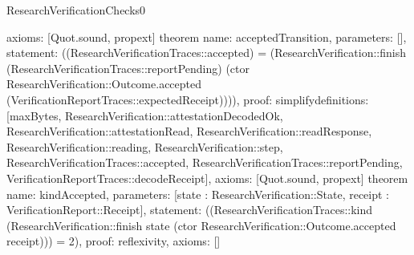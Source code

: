 \begin{lexlean}{ResearchVerificationChecks0}
\begin{semanticmodule}
{  axioms: [Quot.sound, propext]
}
theorem{
  name: acceptedTransition,
  parameters: [],
  statement: ((ResearchVerificationTraces::accepted) = (ResearchVerification::finish (ResearchVerificationTraces::reportPending) (ctor ResearchVerification::Outcome.accepted (VerificationReportTraces::expectedReceipt)))),
  proof: simplify{definitions: [maxBytes, ResearchVerification::attestationDecodedOk, ResearchVerification::attestationRead, ResearchVerification::readResponse, ResearchVerification::reading, ResearchVerification::step, ResearchVerificationTraces::accepted, ResearchVerificationTraces::reportPending, VerificationReportTraces::decodeReceipt]},
  axioms: [Quot.sound, propext]
}
theorem{
  name: kindAccepted,
  parameters: [state : ResearchVerification::State, receipt : VerificationReport::Receipt],
  statement: ((ResearchVerificationTraces::kind (ResearchVerification::finish state (ctor ResearchVerification::Outcome.accepted receipt))) = 2),
  proof: reflexivity{},
  axioms: []
}
\end{semanticmodule}
\end{lexlean}
